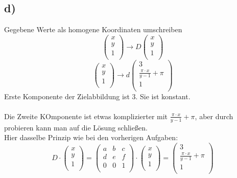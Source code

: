 \documentclass{article}
\begin{document}
\subsection*{d)}
Gegebene Werte als homogene Koordinaten umschreiben
$$
\begin{pmatrix}
    x \\
    y \\
    1 \\
\end{pmatrix}
\rightarrow D
\begin{pmatrix}
    x \\
    y \\
    1 \\
\end{pmatrix}
$$
$$
\begin{pmatrix}
    x \\
    y \\
    1 \\
\end{pmatrix}
\rightarrow d
\begin{pmatrix}
    3 \\
    \frac{\pi \cdot x}{y -1} + \pi \\
    1 \\
\end{pmatrix}
$$
Erste Komponente der Zielabbildung ist 3. Sie ist konstant.\\
\\
Die Zweite KOmponente ist etwas komplizierter mit $\frac{\pi \cdot x}{y -1} + \pi$, aber durch probieren kann man auf die Lösung schließen.\\
Hier dasselbe Prinzip wie bei den vorherigen Aufgaben:
$$
D \cdot 
\begin{pmatrix}
    x \\
    y \\
    1 \\
\end{pmatrix}
= 
\begin{pmatrix}
    a & b & c \\
    d & e & f \\
    0 & 0 & 1 \\
\end{pmatrix}
\cdot
\begin{pmatrix}
    x \\
    y \\
    1 \\
\end{pmatrix}
=
\begin{pmatrix}
    3 \\
    \frac{\pi \cdot x}{y -1} + \pi \\
    1 \\
\end{pmatrix}
$$
\end{document}
